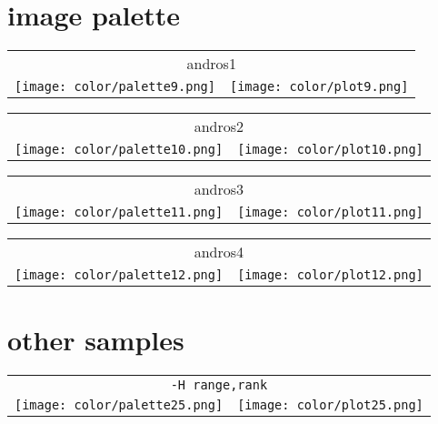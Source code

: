\documentclass{article}
\begin{document}
\newpage
\section{image palette}

\begin{center}
\begin{tabular}{m{8cm}m{8cm}}
\multicolumn{2}{c}{andros1} \\
\texttt{[image: color/palette9.png]} &
\texttt{[image: color/plot9.png]}
\end{tabular}
\end{center}

\begin{center}
\begin{tabular}{m{8cm}m{8cm}}
\multicolumn{2}{c}{andros2} \\
\texttt{[image: color/palette10.png]} &
\texttt{[image: color/plot10.png]}
\end{tabular}
\end{center}

\begin{center}
\begin{tabular}{m{8cm}m{8cm}}
\multicolumn{2}{c}{andros3} \\
\texttt{[image: color/palette11.png]} &
\texttt{[image: color/plot11.png]}
\end{tabular}
\end{center}

\begin{center}
\begin{tabular}{m{8cm}m{8cm}}
\multicolumn{2}{c}{andros4} \\
\texttt{[image: color/palette12.png]} &
\texttt{[image: color/plot12.png]}
\end{tabular}
\end{center}

\newpage
\section{other samples}

\begin{center}
\begin{tabular}{m{8cm}m{8cm}}
\multicolumn{2}{c}{\tt -H range,rank} \\
\texttt{[image: color/palette25.png]} &
\texttt{[image: color/plot25.png]}
\end{tabular}
\end{center}
\end{document}
